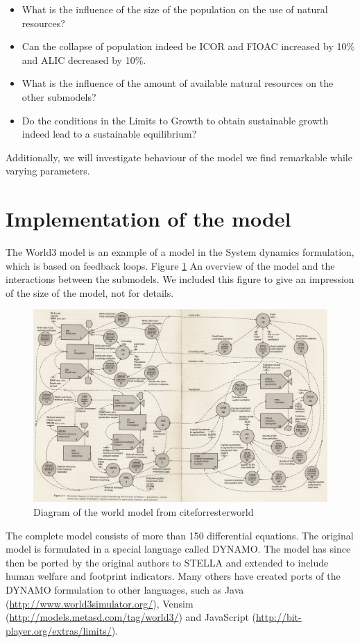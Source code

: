 \documentclass[10pt,a4paper]{scrartcl}
\begin{document}
\begin{itemize}
	\item What is the influence of the size of the population on the use of natural resources?
	\item Can the collapse of population indeed be ICOR and FIOAC increased by 10\% and ALIC decreased by 10\%.
	\item What is the influence of the amount of available natural resources on the other submodels?
	\item Do the conditions in the Limits to Growth to obtain sustainable growth indeed lead to a sustainable equilibrium?
\end{itemize}

Additionally, we will investigate behaviour of the model we find remarkable while varying parameters.

\section*{Implementation of the model}

The World3 model is an example of a model in the System dynamics formulation, which is based on feedback loops. Figure \ref{world3} An overview of the model and the interactions between the submodels. We included this figure to give an impression of the size of the model, not for details.

\begin{figure}
\centering
\includegraphics[width=\textwidth]{./plaatjes/model.jpg}
\caption{Diagram of the world model from cite{forresterworld}}
\label{world3}
\end{figure}

The complete model consists of more than 150 differential equations. The original model is formulated in a special language called DYNAMO. The model has since then be ported by the original authors to STELLA and extended to include human welfare and footprint indicators. Many others have created ports of the DYNAMO formulation to other languages, such as Java (\url{http://www.world3simulator.org/}), Vensim (\url{http://models.metasd.com/tag/world3/}) and JavaScript (\url{http://bit-player.org/extras/limits/}).
\end{document}
